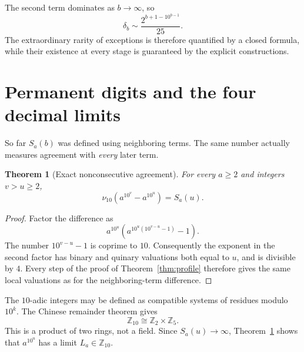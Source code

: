\documentclass[11pt,a4paper]{article}
\newtheorem{theorem}{Theorem}[section]
\theoremstyle{definition}
\newcommand{\Z}{\mathbb Z}
\begin{document}
The second term dominates as $b\to\infty$, so
\begin{equation}\label{eq:density-asymptotic}
\delta_b\sim\frac{2^{b+1-10^{b-1}}}{25}.
\end{equation}
The extraordinary rarity of exceptions is therefore quantified by a
closed formula, while their existence at every stage is guaranteed by the
explicit constructions.

\section{Permanent digits and the four decimal limits}\label{sec:limits}

So far $S_a(b)$ was defined using neighboring terms. The same number actually
measures agreement with \emph{every} later term.

\begin{theorem}[Exact nonconsecutive agreement]\label{thm:nonconsecutive}
For every $a\ge2$ and integers $v>u\ge2$,
\begin{equation}\label{eq:nonconsecutive}
\nu_{10}\!\left(a^{10^v}-a^{10^u}\right)=S_a(u).
\end{equation}
\end{theorem}
\begin{proof}
Factor the difference as
\[
a^{10^u}\left(a^{10^u(10^{v-u}-1)}-1\right).
\]
The number $10^{v-u}-1$ is coprime to $10$. Consequently the exponent in
the second factor has binary and quinary valuations both equal to $u$,
and is divisible by $4$. Every step of the proof of
Theorem~\ref{thm:profile} therefore gives the same local valuations as for
the neighboring-term difference.
\end{proof}

The $10$-adic integers may be defined as compatible systems of residues
modulo $10^k$. The Chinese remainder theorem gives
\[
\Z_{10}\cong\Z_2\times\Z_5.
\]
This is a product of two rings, not a field. Since $S_a(u)\to\infty$,
Theorem~\ref{thm:nonconsecutive} shows that $a^{10^u}$ has a limit
$L_a\in\Z_{10}$.
\end{document}
